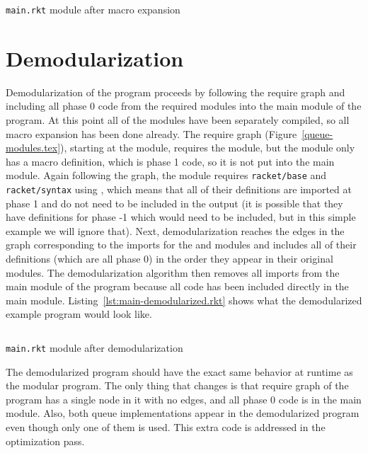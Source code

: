 \begin{listing}
  \inputminted{racket}{listings/main-expanded.rkt}
  \caption{\texttt{main.rkt} module after macro expansion}
  \label{lst:main-expanded.rkt}
\end{listing}


\section{Demodularization}

Demodularization of the program proceeds by following the require graph and including all phase 0 code from the required modules into the main module of the program. 
At this point all of the modules have been separately compiled, so all macro expansion has been done already.
The require graph (Figure~\ref{queue-modules.tex}), starting at the  module, requires the  module, but the  module only has a macro definition, which is phase 1 code, so it is not put into the main module.
Again following the graph, the  module requires \texttt{racket/base} and \texttt{racket/syntax} using , which means that all of their definitions are imported at phase 1 and do not need to be included in the output (it is possible that they have definitions for phase -1 which would need to be included, but in this simple example we will ignore that). 
Next, demodularization reaches the edges in the graph corresponding to the imports for the  and  modules and includes all of their definitions (which are all phase 0) in the order they appear in their original modules.
The demodularization algorithm then removes all imports from the main module of the program because all code has been included directly in the main module.
Listing~\ref{lst:main-demodularized.rkt} shows what the demodularized example program would look like.

\begin{listing}
  \inputminted{racket}{listings/main-demodularized.rkt}
  \caption{\texttt{main.rkt} module after demodularization}
  \label{lst:main-demodularized.rkt}
\end{listing}

The demodularized program should have the exact same behavior at runtime as the modular program.
The only thing that changes is that require graph of the program has a single node in it with no edges, and all phase 0 code is in the main module. 
Also, both queue implementations appear in the demodularized program even though only one of them is used.
This extra code is addressed in the optimization pass.

